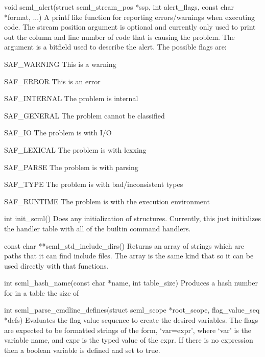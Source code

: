 \begin{cprototypelist}
  \item[void scml_alert(struct scml_stream_pos *ssp, int
  alert_flags, const char *format, ...)] A printf like function for reporting
  errors/warnings when executing \SCML{} code.  The stream position argument is
  optional and currently only used to print out the column and line number of
  code that is causing the problem.  The  argument is
  a bitfield used to describe the alert.  The possible flags are:

  \begin{cidentifierlist}
    \item[SAF_WARNING] This is a warning
    \item[SAF_ERROR] This is an error
    \item[SAF_INTERNAL] The problem is internal
    \item[SAF_GENERAL] The problem cannot be classified
    \item[SAF_IO] The problem is with I/O
    \item[SAF_LEXICAL] The problem is with lexxing
    \item[SAF_PARSE] The problem is with parsing
    \item[SAF_TYPE] The problem is with bad/inconsistent types
    \item[SAF_RUNTIME] The problem is with the execution environment
  \end{cidentifierlist}

  \item[int init_scml()] Does any initialization of \SCML{}
  structures.  Currently, this just initializes the handler table with all of
  the builtin command handlers.

  \item[const char **scml_std_include_dirs()] Returns an array of
  strings which are paths that it can find include files.  The array is the
  same kind that  so it can be used directly with that
  functions.

  \item[int scml_hash_name(const char *name, int table_size)]
  Produces a hash number for  in a table the size of

  \item[int scml_parse_cmdline_defines(struct scml_scope
  *root_scope, flag_value_seq *defs)] Evaluates the flag value sequence to
  create the desired \SCML{} variables.  The flags are expected to be formatted
  strings of the form, `var=expr', where `var' is the variable name, and expr
  is the typed value of the expr.  If there is no expression then a boolean
  variable is defined and set to true.


\end{cprototypelist}
